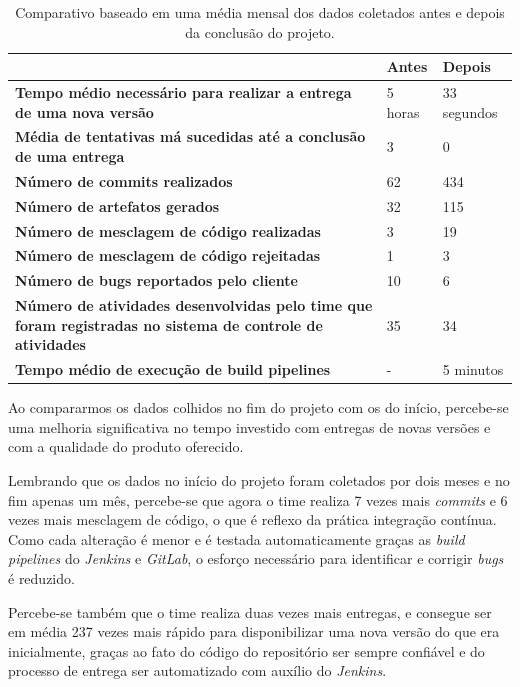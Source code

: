 \documentclass[
12pt,				%
openright,			%
oneside,			%
a4paper,			%
english,			%
french,				%
spanish,			%
brazil,				%
]{abntex2}
\begin{document}
\begin{table}[htb]
	\caption{Comparativo baseado em uma média mensal dos dados coletados antes e depois da conclusão do projeto.}
	
	\label{tab-comparativo}	
	\begin{tabular}{p{7.85cm}|p{3.20cm}|p{3.20cm}}
		& \textbf{Antes} & \textbf{Depois}  \\
		\hline
		\textbf{Tempo médio necessário para realizar a entrega de uma nova versão} & 5 horas & 33 segundos \\
		\hline
		\textbf{Média de tentativas má sucedidas até a conclusão de uma entrega} & 3 & 0 \\
		\hline
		\textbf{Número de commits realizados} & 62 & 434 \\
		\hline
		\textbf{Número de artefatos gerados} & 32 & 115 \\
		\hline
		\textbf{Número de mesclagem de código realizadas} & 3 & 19 \\
		\hline
		\textbf{Número de mesclagem de código rejeitadas} & 1 & 3 \\
		\hline
		\textbf{Número de bugs reportados pelo cliente} & 10 & 6 \\
		\hline
		\textbf{Número de atividades desenvolvidas pelo time que foram registradas no sistema de controle de atividades} & 35 & 34 \\
		\hline
		\textbf{Tempo médio de execução de build pipelines} & - & 5 minutos \\
	\end{tabular}
\end{table}

Ao compararmos os dados colhidos no fim do projeto com os do início, percebe-se uma melhoria significativa no tempo investido com entregas de novas versões e com a qualidade do produto oferecido.

Lembrando que os dados no início do projeto foram coletados por dois meses e no fim apenas um mês, percebe-se que agora o time realiza 7 vezes mais \textit{commits} e 6 vezes mais mesclagem de código, o que é reflexo da prática integração contínua. Como cada alteração é menor e é testada automaticamente graças as \textit{build pipelines} do \textit{Jenkins} e \textit{GitLab}, o esforço necessário para identificar e corrigir \textit{bugs} é reduzido.

Percebe-se também que o time realiza duas vezes mais entregas, e consegue ser em média 237 vezes mais rápido para disponibilizar uma nova versão do que era inicialmente, graças ao fato do código do repositório ser sempre confiável e do processo de entrega ser automatizado com auxílio do \textit{Jenkins}.
\end{document}
